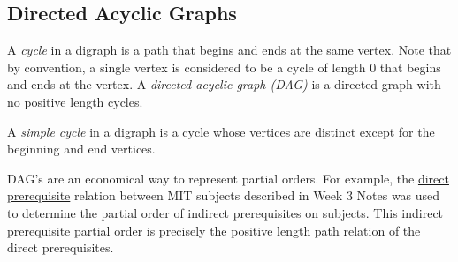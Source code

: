 

\fi

\subsection{Directed Acyclic Graphs}\label{sec:dag2}

\begin{definition}
A \emph{cycle} in a digraph is a path that begins and ends at the same
vertex.  Note that by convention, a single vertex is considered to be a
cycle of length 0 that begins and ends at the vertex.  A \emph{directed
acyclic graph (DAG)} is a directed graph with no positive length cycles.

A \emph{simple cycle} in a digraph is a cycle whose vertices are distinct
except for the beginning and end vertices.
\end{definition}

\iffalse

DAG's are an economical way to represent partial orders.  For example, the
\href{http://courses.csail.mit.edu/6.042/spring09/ln3.pdf#partial.orders}
{direct prerequisite} relation between MIT subjects described in Week 3
Notes was used to determine the partial order of indirect prerequisites on
subjects.  This indirect prerequisite partial order is precisely the
positive length path relation of the direct prerequisites.

